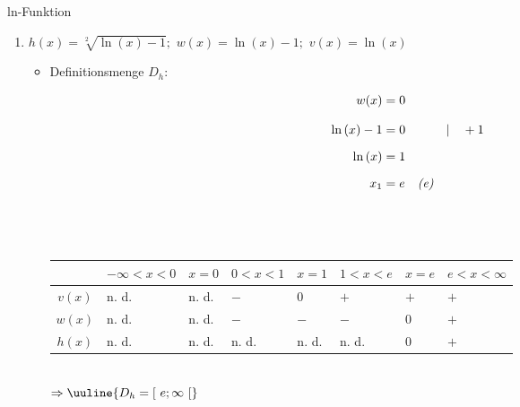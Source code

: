 \begin{Exercise}{ln-Funktion}{}
\begin{enumerate}
{\begin{itemize}[leftmargin=*]
{\begin{align*}
                    \lim\limits_{x \to \infty} \ln\left(\dfrac{4 \cdot x}{x^{2} + 4}\right) &= \lim\limits_{x \to \infty} \ln\left(\dfrac{z'(x)}{n'(x)}\right) = \lim\limits_{x \to \infty} \ln\left(\overbrace{\dfrac{4}{2 \cdot x}}^{\textcolor{myg}{0^{+}}}\right) &= -\infty &&
                \end{align*}
                }
        \end{itemize}
        }
    \item [c)]{
        $h(x) = \sqrt[2]{\ln\left(x\right) - 1};$ \qquad $w(x) = \ln\left(x\right) - 1;$ \qquad $v(x) = \ln\left(x\right)$\\[-2.0ex]
        \begin{itemize}[leftmargin=*]
            \item Definitionsmenge $D_{h}$:\\{
                \vspace{-2.0ex}
                \begin{minipage}[t]{\linewidth}
                    \vspace{-2.0ex}
                    \begin{align*}
                        w(x) &= 0 \\[2.0ex]
                        \ln\left(x\right) - 1 &= 0 &&| \quad +1\\[1.5ex]
                        \ln\left(x\right) &= 1 &&\\[1.5ex]
                        x_{1} &= e \quad \text{\textit{(e)}}&&
                    \end{align*}\\[-2.0ex]
                \end{minipage}\\
                \begin{tabularx}{\linewidth}{c|l|l|l|l|l|l|l}
                    & $-\infty < x < 0$ & $x = 0$ & $0 < x < 1$ & $x = 1$ & $1 < x < e$ & $x = e$ & $e < x < \infty$ \\ \hline
                    $v(x)$ & n. d. & n. d. & $-$ & $0$ & $+$ & $+$ & $+$ \\ \hline
                    $w(x)$ & n. d. & n. d. & $-$ & $-$ & $-$ & $0$ & $+$ \\ \hline
                    $h(x)$ & n. d. & n. d. & n. d. & n. d. & n. d. & $0$ & $+$ \\            
                \end{tabularx}\\[3.0ex]
                $\Rightarrow \uuline{D_{h} = \left[ \ e; \infty \ \right[}$\\
}
\end{itemize}}
\end{enumerate}
\end{Exercise}
